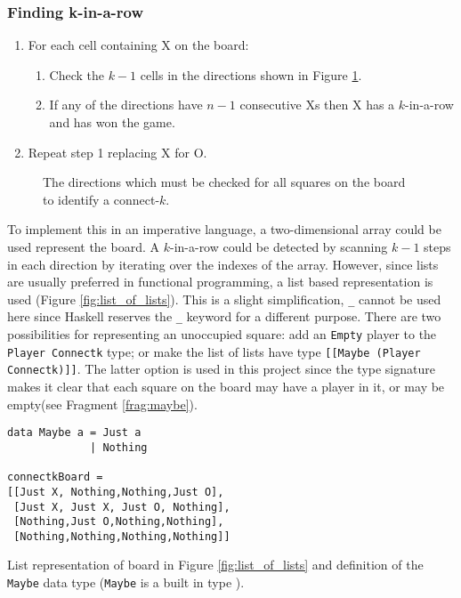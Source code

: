 \subsubsection{Finding k-in-a-row}
\begin{enumerate}
\item For each cell containing X on the board:
	\begin{enumerate}
	\item Check the $k-1$ cells in the directions shown in Figure \ref{fig:connectn_directions}. 
	\item If any of the directions have $n-1$ consecutive Xs then X has a $k$-in-a-row and has won the game.
	\end{enumerate}
\item Repeat step 1 replacing X for O.
\end{enumerate}
\begin{figure}[]
\centering
\scalebox{0.5}{}
\caption{The directions which must be checked for all squares on the board to identify a connect-$k$.}
\label{fig:connectn_directions}
\end{figure}
To implement this in an imperative language, a two-dimensional array could be used represent the board. A $k$-in-a-row could be detected by scanning $k-1$ steps in each direction by iterating over the indexes of the array. However, since lists are usually preferred in functional programming, a list based representation is used (Figure \ref{fig:list_of_lists}). This is a slight simplification, \texttt{\_} cannot be used here since Haskell reserves the \texttt{\_} keyword for a different purpose. There are two possibilities for representing an unoccupied square: add an \texttt{Empty} player to the \texttt{Player Connectk} type; or make the list of lists have type \texttt{[[Maybe (Player Connectk)]]}. The latter option is used in this project since the type signature makes it clear that each square on the board may have a player in it, or may be empty(see Fragment \ref{frag:maybe}).
\begin{fragment}
\begin{lstlisting}
data Maybe a = Just a
             | Nothing

connectkBoard =
[[Just X, Nothing,Nothing,Just O],
 [Just X, Just X, Just O, Nothing],
 [Nothing,Just O,Nothing,Nothing],
 [Nothing,Nothing,Nothing,Nothing]]
\end{lstlisting}
\caption{\label{frag:maybe}List representation of board in Figure \ref{fig:list_of_lists} and definition of the \texttt{Maybe} data type (\texttt{Maybe} is a built in type \cite{docs}).}
\end{fragment}


